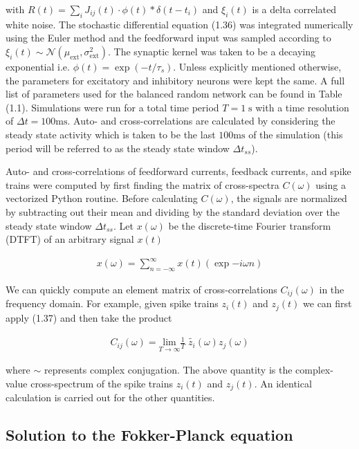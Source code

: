 \documentclass{ucetd}
\begin{document}
with $R(t) = \sum_{i} J_{ij}(t)\cdot \phi(t) * \delta(t-t_{i})$ and $\xi_{i}(t)$ is a delta correlated white noise. The stochastic differential equation (1.36) was integrated numerically using the Euler method and the feedforward input was sampled according to $\xi_{i}(t) \sim \mathcal{N}(\mu_{\mathrm{ext}},\sigma_{\mathrm{ext}}^{2})$. The synaptic kernel was taken to be a decaying exponential i.e. $\phi(t) = \exp(-t/\tau_{s})$. Unless explicitly mentioned otherwise, the parameters for excitatory and inhibitory neurons were kept the same. A full list of parameters used for the balanced random network can be found in Table (1.1). Simulations were run for a total time period $T = 1 \;\mathrm{s}$ with a time resolution of $\Delta t = 100\mathrm{ms}$. Auto- and cross-correlations are calculated by considering the steady state activity which is taken to be the last $100\mathrm{ms}$ of the simulation (this period will be referred to as the steady state window $\Delta t_{ss}$).

Auto- and cross-correlations of feedforward currents, feedback currents, and spike trains were computed by first finding the matrix of cross-spectra $C(\omega)$ using a vectorized Python routine. Before calculating $C(\omega)$, the signals are normalized by subtracting out their mean and dividing by the standard deviation over the steady state window $\Delta t_{ss}$. Let $x(\omega)$ be the discrete-time Fourier transform (DTFT) of an arbitrary signal $x(t)$

\begin{align}
x(\omega) = \sum_{n =-\infty}^{\infty}x(t)\left(\exp{-i\omega n}\right)
\end{align}

We can quickly compute an element matrix of cross-correlations $C_{ij}(\omega)$ in the frequency domain. For example, given spike trains $z_{i}(t)$ and $z_{j}(t)$ we can first apply (1.37) and then take the product

\begin{align}
C_{ij}(\omega) = \underset{T\rightarrow\infty}{\mathrm{lim}}\frac{1}{T}\;\tilde{z_{i}}(\omega)z_{j}(\omega)
\end{align}

where $\sim$ represents complex conjugation. The above quantity is the complex-value cross-spectrum of the spike trains $z_{i}(t)$ and $z_{j}(t)$. An identical calculation is carried out for the other quantities.

\subsection{Solution to the Fokker-Planck equation}
\end{document}
